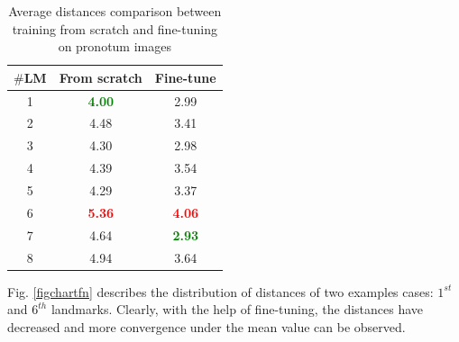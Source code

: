 \documentclass[review]{elsarticle}
\begin{document}
\begin{table}[htbp]
	\centering
	\begin{tabular}{|c|c|c|}
		\hline
		\textbf{$\#$LM} & \textbf{From scratch} & \textbf{Fine-tune} \\ \hline
		1 & \textcolor{green}{\textbf{4.00 }}& 2.99\\ \hline
		2 & 4.48 & 3.41  \\ \hline
		3 & 4.30  & 2.98 \\ \hline
		4 & 4.39  & 3.54\\ \hline
		5 & 4.29  & 3.37 \\ \hline
		6 & \textcolor{red}{\textbf{5.36}}  & \textcolor{red}{\textbf{4.06}} \\ \hline
		7 & 4.64  & \textcolor{green}{\textbf{2.93}} \\ \hline
		8 & 4.94  & 3.64 \\ \hline
	\end{tabular}
	\caption{Average distances comparison between training from scratch and fine-tuning on pronotum images}
	\label{cmppronotum}
\end{table}

Fig. \ref{figchartfn} describes the distribution of distances
of two examples cases: $1^{st}$ and $6^{th}$ landmarks. Clearly, with
the help of fine-tuning, the distances have decreased and more
convergence under the mean value can be observed.
\end{document}
